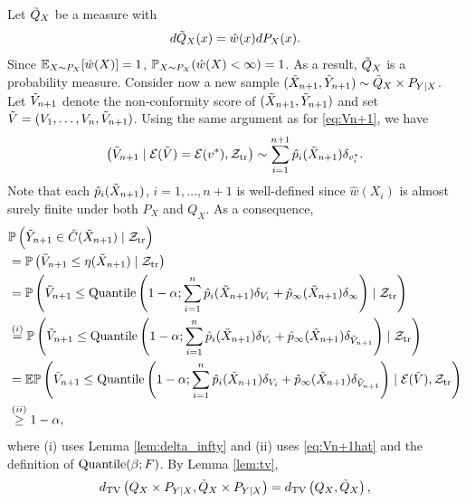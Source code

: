 Let $\td{Q}_{X}$ be a measure with
\[d\td{Q}_{X}(x) = \hat{w}(x) dP_{X}(x).\]
Since $\E_{X\sim P_{X}}[\hat{w}(X)] = 1$, $\P_{X\sim P_{X}}(\hat{w}(X) < \infty) = 1$. As a result, $\td{Q}_{X}$ is a
probability measure.
Consider now a new sample
$(\td{X}_{n+1}, \td{Y}_{n+1})\sim \td{Q}_{X}\times P_{Y \mid X}$. Let
$\td{V}_{n+1}$ denote the non-conformity score of
$(\td{X}_{n+1}, \td{Y}_{n+1})$ and set
$\td{V} = (V_{1}, \ldots, V_{n}, \td{V}_{n+1})$. Using the same
argument as for \eqref{eq:Vn+1}, we have
\begin{equation}
  \label{eq:Vn+1hat}
  \lb \td{V}_{n+1} \mid \cE(\td{V})= \cE(v^{*}), \Z_{\tr}\rb \sim \sum_{i=1}^{n+1}\hat{p}_{i}(\td{X}_{n+1})\delta_{v_{i}^{*}}.
\end{equation}
Note that each $\hat{p}_{i}(\td{X}_{n+1})$,
  $i = 1,\ldots, n+1$ is well-defined since $\hat{w}(X_i)$ is almost
  surely finite under both $P_{X}$ and $Q_{X}$. As a consequence,
\begin{align}
  & \P\lb\td{Y}_{n+1}\in \hat{C}(\td{X}_{n+1})\mid \Z_{\tr}\rb\nonumber\\
  & = \P\lb \td{V}_{n + 1}\le \eta(\td{X}_{n+1})\mid \Z_{\tr}\rb\nonumber\\
  & = \P\lb \td{V}_{n + 1}\le \qt\lb 1 - \alpha; \sum_{i=1}^{n}\hat{p}_{i}(\td{X}_{n+1})\delta_{V_{i}} + \hat{p}_{\infty}(\td{X}_{n+1})\delta_{\infty}\rb\mid \Z_{\tr}\rb\nonumber\\
  & \stackrel{(i)}{=} \P\lb \td{V}_{n + 1}\le \qt\lb 1 - \alpha; \sum_{i=1}^{n}\hat{p}_{i}(\td{X}_{n+1})\delta_{V_{i}} + \hat{p}_{\infty}(\td{X}_{n+1})\delta_{\td{V}_{n+1}}\rb\mid \Z_{\tr}\rb\nonumber\\
  & = \E \P\lb \td{V}_{n + 1}\le \qt\lb 1 - \alpha; \sum_{i=1}^{n}\hat{p}_{i}(\td{X}_{n+1})\delta_{V_{i}} + \hat{p}_{\infty}(\td{X}_{n+1})\delta_{\td{V}_{n+1}}\rb \mid \cE(\td{V}), \Z_{\tr}\rb\nonumber\\
  & \stackrel{(ii)}{\ge} 1 - \alpha, \label{eq:coverage_tilde}
\end{align}
where (i) uses Lemma \ref{lem:delta_infty} and (ii) uses \eqref{eq:Vn+1hat} and the
definition of $\qt(\beta; F)$.  By Lemma \ref{lem:tv},
\[\tv\lb Q_{X}\times P_{Y\mid X}, \td{Q}_{X}\times P_{Y\mid X}\rb = \tv\lb Q_{X}, \td{Q}_{X}\rb,\]
